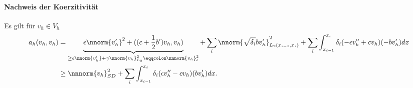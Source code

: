 \paragraph{Nachweis der Koerzitivität}
Es gilt für $v_{h} \in V_{h}$
\begin{align*}
  a_{h}(v_{h}, v_{h}) &= \underbrace{\epsilon \nnorm{v_{h}'}^{2} + ((c + \frac 12 b')v_{h}, v_{h})}_{\geq \epsilon \nnorm{v_{h}'} + \gamma\nnorm{v_{h}}_{L_{2}}^{2} \eqqcolon \nnnorm{v_{h}}_{\epsilon}^{2}} + \sum_{i}\nnorm{\sqrt{\delta_{i}} bv_{h}'}_{L_{2}(x_{i-1}, x_{i})}^{2} + \sum_{i} \int_{x_{i-1}}^{ x_{i}}\delta_{i}(-\epsilon v_{h}'' + c v_{h})(- bv_{h}')dx\\
  &\geq \nnnorm{v_{h}}_{SD}^{2} + \sum_{i} \int_{x_{i-1}}^{ x_{i}}\delta_{i}(\epsilon v_{h}'' -  c v_{h})(bv_{h}')dx. 
\end{align*}

